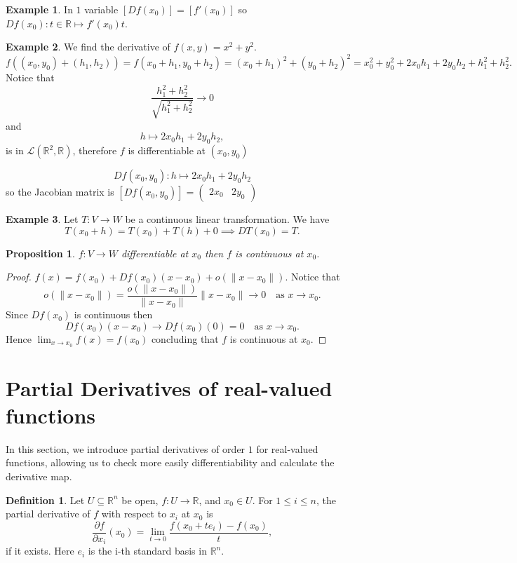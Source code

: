 \documentclass[11pt,openany]{book}
\theoremstyle{plain}
\newtheorem{proposition}{Proposition}[chapter]
\theoremstyle{definition}
\newtheorem{definition}{Definition}[chapter]
\newtheorem{example}{Example}[chapter]
\theoremstyle{remark}
\newcommand{\R}{\mathbb{R}}
\begin{document}
\begin{example}
    In $1$ variable $[Df(x_0)] = [f'(x_0)]$ so $Df(x_0): t\in \mathbb R \mapsto f'(x_0) t$. 
\end{example}
\begin{example}
We find the derivative of $f(x,y) = x^2 + y^2$. \[f((x_0,y_0)+(h_1,h_2)) = f(x_0+h_1,y_0+h_2) = (x_0+h_1)^2+(y_0+h_2)^2 = x_0^2+y_0^2+2x_0h_1+2y_0h_2+h_1^2+h_2^2. \] Notice that \[\frac{h_1^2+h_2^2}{\sqrt{h_1^2+h_2^2}} \to 0\] and 
$$h\mapsto 2x_0h_1+2y_0h_2,$$
is in $\mathcal L(\mathbb R^2, \mathbb R)$, therefore $f$ is differentiable at $(x_0,y_0)$

\[Df(x_0,y_0): h \mapsto 2x_0h_1+2y_0h_2\] so the Jacobian matrix is $[Df(x_0,y_0)] = \begin{pmatrix}
        2x_0 & 2y_0
    \end{pmatrix}$
\end{example}
\begin{example}
    Let $T: V \to W$ be a continuous linear transformation. We have
    \[T(x_0+h) = T(x_0)+T(h)+0\implies DT(x_0) = T.\]
\end{example}

\begin{proposition}
    $f: V \to W$ differentiable at $x_0$ then $f$ is continuous at $x_0$.
\end{proposition}
\begin{proof}
    $f(x) = f(x_0)+Df(x_0)(x-x_0)+o(\|x-x_0\|)$.
    Notice that
    $$o(\|x-x_0\|) = \frac{o(\|x-x_0\|)}{\|x-x_0\|}\|x-x_0\| \to 0\quad \text{as $x\to x_0$}.$$ Since $Df(x_0)$ is continuous then 
    $$Df(x_0)(x-x_0)\to Df(x_0)(0)=0\quad \text{as $x\to x_0$}.$$
    Hence $\lim_{x\to x_0} f(x) = f(x_0)$ concluding that $f$ is continuous at $x_0$.
\end{proof}
\section{Partial Derivatives of real-valued functions}
In this section, we introduce partial derivatives of order $1$ for real-valued functions, allowing us to check more easily differentiability and calculate the derivative map.

\begin{definition}
    Let $U\subseteq \R^n$ be open, $f:U\to \R$, and $x_0\in U$. For $1\leq i\leq n$, the partial derivative of $f$ with respect to $x_i$ at $x_0$ is
    \[\frac{\partial f}{\partial x_i}(x_0) = \lim_{t \to 0} \frac{f(x_0+te_i)-f(x_0)}{t},\]
    if it exists.
    Here $e_i$ is the i-th standard basis in $\mathbb R^n$.
\end{definition}
\end{document}
